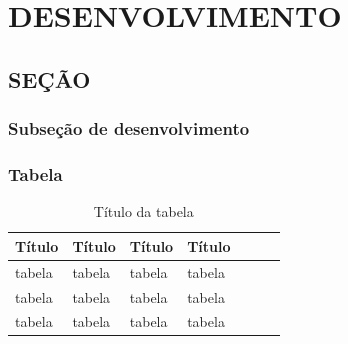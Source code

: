 \chapter{DESENVOLVIMENTO}

\lipsum[1-2]

\section{SEÇÃO}

\lipsum[1-1]

\subsection{Subseção de desenvolvimento}

\lipsum[1-1]

\subsection{Tabela}

\begin{table}[htb]
	\footnotesize
	\caption[Título na lista de tabelas]{Título da tabela}
	\label{tab-inicial}
    \begin{tabular}{p{2.6cm}lp{6.0cm}lp{2.25cm}lp{3.40cm}}
    \hline
    \textbf{Título} & \textbf{Título} & \textbf{Título} & \textbf{Título} \\ \hline
    tabela & tabela & tabela & tabela\\
    tabela & tabela & tabela & tabela\\
    tabela & tabela & tabela & tabela\\ \hline
    \end{tabular}
\end{table}

\lipsum[1-1]

